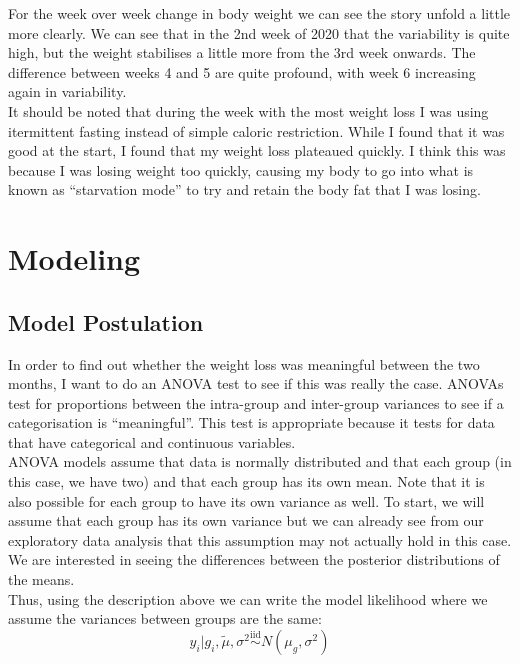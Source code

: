 \documentclass[journal, a4paper]{IEEEtran}
\begin{document}
For the week over week change in body weight we can see the story unfold a little more clearly. We can see that in the 2nd week of 2020 that the 
variability is quite high, but the weight stabilises a little more from the 3rd week onwards. The difference between weeks 4 and 5 are quite profound, with week
6 increasing again in variability.\\

It should be noted that during the week with the most weight loss I was using itermittent fasting instead of simple caloric restriction. While I found that it 
was good at the start, I found that my weight loss plateaued quickly. I think this was because I was losing weight too quickly, causing my body to go into what
is known as ``starvation mode'' to try and retain the body fat that I was losing.

\section{Modeling}

\subsection{Model Postulation}

In order to find out whether the weight loss was meaningful between the two months, I want to do an ANOVA test to see if this was really the case. ANOVAs test
for proportions between the intra-group and inter-group variances to see if a categorisation is ``meaningful''. This test is appropriate because it tests for
data that have categorical and continuous variables.\\

ANOVA models assume that data is normally distributed and that each group (in this case, we have two) and that each group has its own mean. Note that it is also
possible for each group to have its own variance as well. To start, we will assume that each group has its own variance but we can already see from our 
exploratory data analysis that this assumption may not actually hold in this case. We are interested in seeing the differences between the posterior
distributions of the means.\\

Thus, using the description above we can write the model likelihood where we assume the variances between groups are the same:\\

$$y_i | g_i,  \tilde\mu, \sigma^2 \overset{\text{iid}}{\sim} N(\mu_g, \sigma^2)$$
\end{document}
